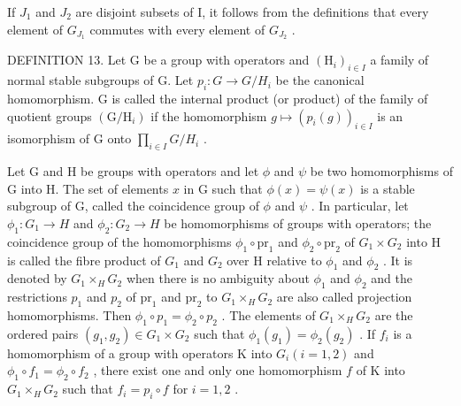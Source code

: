 If \(J_{1}\) and \(J_{2}\) are disjoint subsets of I, it follows from the definitions that every element of \(G_{J_{1}}\) commutes with every element of \(G_{J_{2}}\) .

DEFINITION 13. Let G be a group with operators and \((\mathrm{H}_{i})_{i\in I}\) a family of normal stable subgroups of G. Let \(p_{i}\colon G\to G/H_{i}\) be the canonical homomorphism. G is called the internal product (or product) of the family of quotient groups \((\mathrm{G}/\mathrm{H}_{i})\) if the homomorphism \(g\mapsto(p_{i}(g))_{i\in I}\) is an isomorphism of G onto \(\prod_{i\in I}G/H_{i}\) .

Let G and H be groups with operators and let \(\phi\) and \(\psi\) be two homomorphisms of G into H. The set of elements \(x\) in G such that \(\phi(x) = \psi(x)\) is a stable subgroup of G, called the coincidence group of \(\phi\) and \(\psi\) . In particular, let \(\phi_1: G_1 \to H\) and \(\phi_2: G_2 \to H\) be homomorphisms of groups with operators; the coincidence group of the homomorphisms \(\phi_1 \circ \mathrm{pr}_1\) and \(\phi_2 \circ \mathrm{pr}_2\) of \(G_1 \times G_2\) into H is called the fibre product of \(G_1\) and \(G_2\) over H relative to \(\phi_1\) and \(\phi_2\) . It is denoted by \(G_1 \times_H G_2\) when there is no ambiguity about \(\phi_1\) and \(\phi_2\) and the restrictions \(p_1\) and \(p_2\) of \(\mathrm{pr}_1\) and \(\mathrm{pr}_2\) to \(G_1 \times_H G_2\) are also called projection homomorphisms. Then \(\phi_1 \circ p_1 = \phi_2 \circ p_2\) . The elements of \(G_1 \times_H G_2\) are the ordered pairs \((g_1, g_2) \in G_1 \times G_2\) such that \(\phi_1(g_1) = \phi_2(g_2)\) . If \(f_i\) is a homomorphism of a group with operators K into \(G_i (i = 1, 2)\) and \(\phi_1 \circ f_1 = \phi_2 \circ f_2\) , there exist one and only one homomorphism \(f\) of K into \(G_1 \times_H G_2\) such that \(f_i = p_i \circ f\) for \(i = 1, 2\) .

